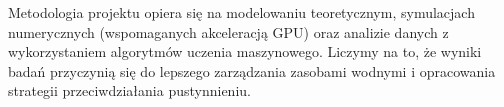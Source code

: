 \documentclass[a4paper,12pt]{article}
\begin{document}
Metodologia projektu opiera się na modelowaniu teoretycznym, symulacjach numerycznych (wspomaganych akceleracją GPU) oraz analizie danych z wykorzystaniem algorytmów uczenia maszynowego. Liczymy na to, że wyniki badań przyczynią się do lepszego zarządzania zasobami wodnymi i opracowania strategii przeciwdziałania pustynnieniu.
\end{document}

